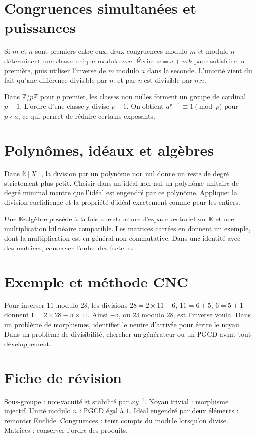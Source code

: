 \documentclass[11pt,a4paper]{article}
\begin{document}
\section*{Congruences simultanées et puissances}
Si $m$ et $n$ sont premiers entre eux, deux congruences modulo $m$ et modulo $n$ déterminent une classe unique modulo $mn$. Écrire $x=a+mk$ pour satisfaire la première, puis utiliser l’inverse de $m$ modulo $n$ dans la seconde. L’unicité vient du fait qu’une différence divisible par $m$ et par $n$ est divisible par $mn$.

Dans $\mathbb Z/p\mathbb Z$ pour $p$ premier, les classes non nulles forment un groupe de cardinal $p-1$. L’ordre d’une classe y divise $p-1$. On obtient $a^{p-1}\equiv1\pmod p$ pour $p\nmid a$, ce qui permet de réduire certains exposants.

\section*{Polynômes, idéaux et algèbres}
Dans $\mathbb K[X]$, la division par un polynôme non nul donne un reste de degré strictement plus petit. Choisir dans un idéal non nul un polynôme unitaire de degré minimal montre que l’idéal est engendré par ce polynôme. Appliquer la division euclidienne et la propriété d’idéal exactement comme pour les entiers.

Une $\mathbb K$-algèbre possède à la fois une structure d’espace vectoriel sur $\mathbb K$ et une multiplication bilinéaire compatible. Les matrices carrées en donnent un exemple, dont la multiplication est en général non commutative. Dans une identité avec des matrices, conserver l’ordre des facteurs.

\section*{Exemple et méthode CNC}
Pour inverser $11$ modulo $28$, les divisions $28=2\times11+6$, $11=6+5$, $6=5+1$ donnent $1=2\times28-5\times11$. Ainsi $-5$, ou $23$ modulo $28$, est l’inverse voulu. Dans un problème de morphismes, identifier le neutre d’arrivée pour écrire le noyau. Dans un problème de divisibilité, chercher un générateur ou un PGCD avant tout développement.

\section*{Fiche de révision}
Sous-groupe : non-vacuité et stabilité par $xy^{-1}$. Noyau trivial : morphisme injectif. Unité modulo $n$ : PGCD égal à $1$. Idéal engendré par deux éléments : remonter Euclide. Congruences : tenir compte du module lorsqu’on divise. Matrices : conserver l’ordre des produits.
\end{document}
